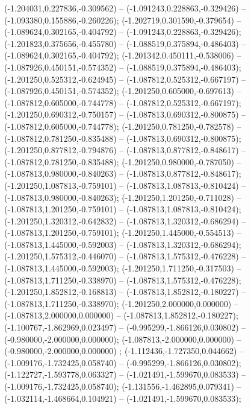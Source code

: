  (-1.204031,0.227836,-0.309562) -- (-1.091243,0.228863,-0.329426) -- (-1.093380,0.155886,-0.260226);
 (-1.202719,0.301590,-0.379654) -- (-1.089624,0.302165,-0.404792) -- (-1.091243,0.228863,-0.329426);
 (-1.201823,0.375656,-0.455780) -- (-1.088519,0.375894,-0.486403) -- (-1.089624,0.302165,-0.404792);
 (-1.201342,0.450111,-0.538006) -- (-1.087926,0.450151,-0.574352) -- (-1.088519,0.375894,-0.486403);
 (-1.201250,0.525312,-0.624945) -- (-1.087812,0.525312,-0.667197) -- (-1.087926,0.450151,-0.574352);
 (-1.201250,0.605000,-0.697613) -- (-1.087812,0.605000,-0.744778) -- (-1.087812,0.525312,-0.667197);
 (-1.201250,0.690312,-0.750157) -- (-1.087813,0.690312,-0.800875) -- (-1.087812,0.605000,-0.744778);
 (-1.201250,0.781250,-0.782578) -- (-1.087812,0.781250,-0.835488) -- (-1.087813,0.690312,-0.800875);
 (-1.201250,0.877812,-0.794876) -- (-1.087813,0.877812,-0.848617) -- (-1.087812,0.781250,-0.835488);
 (-1.201250,0.980000,-0.787050) -- (-1.087813,0.980000,-0.840263) -- (-1.087813,0.877812,-0.848617);
 (-1.201250,1.087813,-0.759101) -- (-1.087813,1.087813,-0.810424) -- (-1.087813,0.980000,-0.840263);
 (-1.201250,1.201250,-0.711028) -- (-1.087813,1.201250,-0.759101) -- (-1.087813,1.087813,-0.810424);
 (-1.201250,1.320312,-0.642832) -- (-1.087813,1.320312,-0.686294) -- (-1.087813,1.201250,-0.759101);
 (-1.201250,1.445000,-0.554513) -- (-1.087813,1.445000,-0.592003) -- (-1.087813,1.320312,-0.686294);
 (-1.201250,1.575312,-0.446070) -- (-1.087813,1.575312,-0.476228) -- (-1.087813,1.445000,-0.592003);
 (-1.201250,1.711250,-0.317503) -- (-1.087813,1.711250,-0.338970) -- (-1.087813,1.575312,-0.476228);
 (-1.201250,1.852812,-0.168813) -- (-1.087813,1.852812,-0.180227) -- (-1.087813,1.711250,-0.338970);
 (-1.201250,2.000000,0.000000) -- (-1.087813,2.000000,0.000000) -- (-1.087813,1.852812,-0.180227);
 (-1.100767,-1.862969,0.023497) -- (-0.995299,-1.866126,0.030802) -- (-0.980000,-2.000000,0.000000);
 (-1.087813,-2.000000,0.000000) -- (-0.980000,-2.000000,0.000000) ;
 (-1.112436,-1.727350,0.044662) -- (-1.009176,-1.732425,0.058740) -- (-0.995299,-1.866126,0.030802);
 (-1.122727,-1.593778,0.063327) -- (-1.021491,-1.599670,0.083533) -- (-1.009176,-1.732425,0.058740);
 (-1.131556,-1.462895,0.079341) -- (-1.032114,-1.468664,0.104921) -- (-1.021491,-1.599670,0.083533);
